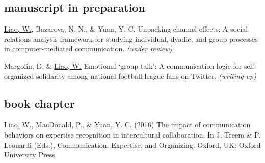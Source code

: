 \documentclass[11pt, letterpaper]{article} %
\newcommand{\years}[1]{\leavevmode\marginnote{\scriptsize #1}} %
\begin{document}

\subsection*{manuscript in preparation}

\begin{hangparas}{.25in}{1}

\underline{Liao, W.}, Bazarova, N. N., \& Yuan, Y. C. Unpacking channel effects: A social relations analysis framework for studying individual, dyadic, and group processes in computer-mediated communication. \textsl{(under review)}

Margolin, D. \& \underline{Liao, W.} Emotional ‘group talk’: A communication logic for self-organized solidarity among national football league fans on Twitter. \textsl{(writing up)}


\end{hangparas}


\subsection*{book chapter}
\begin{hangparas}{.25in}{1}

    \underline{Liao, W.}, \years{2016}  MacDonald, P., \& Yuan, Y. C. (2016) The impact of communication behaviors on expertise recognition in intercultural collaboration. In J. Treem \& P. Leonardi (Eds.), Communication, Expertise, and Organizing. Oxford, UK: Oxford University Press

\end{hangparas}

\end{document}
